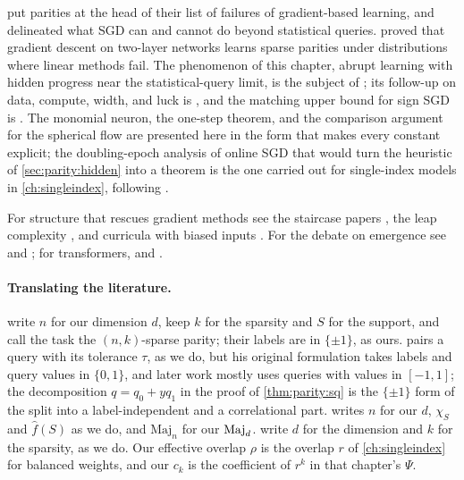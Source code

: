 \begin{refsection}
\Textcite{ShalevShwartzShamirShammah2017} put parities at the head of their list of failures of gradient-based learning, and \textcite{AbbeSandon2020} delineated what SGD can and cannot do beyond statistical queries. \Textcite{DanielyMalach2020} proved that gradient descent on two-layer networks learns sparse parities under distributions where linear methods fail. The phenomenon of this chapter, abrupt learning with hidden progress near the statistical-query limit, is the subject of \textcite{BarakEtAl2022}; its follow-up on data, compute, width, and luck is \textcite{EdelmanEtAl2023}, and the matching upper bound for sign SGD is \textcite{KouEtAl2024}. The monomial neuron, the one-step theorem, and the comparison argument for the spherical flow are presented here in the form that makes every constant explicit; the doubling-epoch analysis of online SGD that would turn the heuristic of \cref{sec:parity:hidden} into a theorem is the one carried out for single-index models in \cref{ch:singleindex}, following \textcite{BenArousGheissariJagannath2021}.

For structure that rescues gradient methods see the staircase papers \parencite{AbbeEtAl2021,AbbeBoixAdseraMisiakiewicz2022}, the leap complexity \parencite{AbbeBoixAdseraMisiakiewicz2023}, and curricula with biased inputs \parencite{CornacchiaMossel2023}. For the debate on emergence see \textcite{WeiEtAl2022} and \textcite{SchaefferMirandaKoyejo2023}; for transformers, \textcite{HahnRofin2024} and \textcite{KimSuzuki2025}.

\paragraph{Translating the literature.}
\Textcite{BarakEtAl2022} write $n$ for our dimension $d$, keep $k$ for the sparsity and $S$ for the support, and call the task the $(n,k)$-sparse parity; their labels are in $\{\pm1\}$, as ours. \Textcite{Kearns1998} pairs a query with its tolerance $\tau$, as we do, but his original formulation takes labels and query values in $\{0,1\}$, and later work mostly uses queries with values in $[-1,1]$; the decomposition $q=q_0+yq_1$ in the proof of \cref{thm:parity:sq} is the $\{\pm1\}$ form of the split into a label-independent and a correlational part. \Textcite{ODonnell2014} writes $n$ for our $d$, $\chi_S$ and $\hat f(S)$ as we do, and $\mathrm{Maj}_n$ for our $\operatorname{Maj}_d$. \Textcite{KouEtAl2024} write $d$ for the dimension and $k$ for the sparsity, as we do. Our effective overlap $\rho$ is the overlap $r$ of \cref{ch:singleindex} for balanced weights, and our $c_k$ is the coefficient of $r^k$ in that chapter's $\Psi$.

\printchapterbib
\end{refsection}
